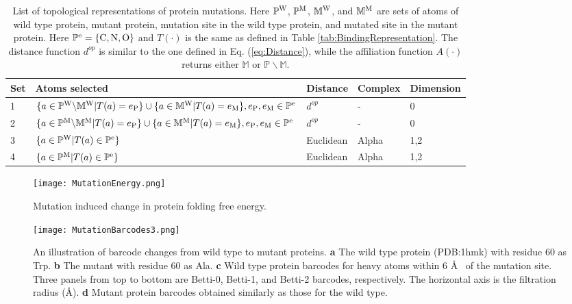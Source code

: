 \documentclass[10pt]{article}
\begin{document}
\begin{table}[ht]
\centering
\caption{List of topological representations of protein mutations. Here $\mathbb{P}^{\rm{W}}$, $\mathbb{P}^{\rm{M}}$, $\mathbb{M}^{\rm{W}}$, and $\mathbb{M}^{\rm{M}}$ are sets of atoms of wild type protein, mutant protein, mutation site in the wild type protein, and mutated site in the mutant protein. Here $\mathbb{P}^{\rm{e}}=\{\rm C, N, O \}$ and $T(\cdot)$ is the same as defined in Table \ref{tab:BindingRepresentation}. The distance function $d^{op}$ is similar to the one defined in Eq. (\ref{eq:Distance}), while the affiliation function $A(\cdot)$ returns either $\mathbb{M}$ or $\mathbb{P}\backslash\mathbb{M}$.}
\label{tab:MutationRepresentation}
\begin{tabular}{|l|l|l|l|l|}
\hline
 Set & Atoms selected & Distance & Complex & Dimension \\
\hline
1 & $\{a\in \mathbb{P}^{\rm{W}}\backslash\mathbb{M}^{\rm{W}}|T(a)=e_{\rm{P}}\}\cup\{a\in \mathbb{M}^{\rm{W}}|T(a)=e_{\rm{M}}\}, e_{\rm{P}},e_{\rm{M}}\in\mathbb{P}^{\rm{e}}$& $d^{op}$ & - & 0 \\
\hline
2 & $\{a\in \mathbb{P}^{\rm{M}}\backslash\mathbb{M}^{\rm{M}}|T(a)=e_{\rm{P}}\}\cup\{a\in \mathbb{M}^{\rm{M}}|T(a)=e_{\rm{M}}\}, e_{\rm{P}},e_{\rm{M}}\in\mathbb{P}^{\rm{e}}$& $d^{op}$ & - & 0 \\
\hline
3 & $\{a\in\mathbb{P}^{\rm{W}}|T(a)\in\mathbb{P}^{\rm{e}}\}$ & Euclidean & Alpha & 1,2 \\
\hline
4 & $\{a\in\mathbb{P}^{\rm{M}}|T(a)\in\mathbb{P}^{\rm{e}}\}$ & Euclidean & Alpha & 1,2 \\
\hline
\end{tabular}
\end{table}

\begin{figure}[ht]
\begin{center}
\texttt{[image: MutationEnergy.png]}
\caption{Mutation induced   change in protein folding free energy.}
\label{fig:MutationEnergy}
\end{center}
\end{figure}

\begin{figure}
\begin{center}
\texttt{[image: MutationBarcodes3.png]} %
\caption{An illustration of   barcode changes from wild type  to  mutant proteins. 
\textbf{a} The wild type protein (PDB:1hmk) with residue 60 as Trp. 
\textbf{b} The mutant with residue 60 as Ala. 
\textbf{c} Wild type protein barcodes for  heavy atoms  within 6 \AA~ of the mutation site.   Three panels  from top to bottom are Betti-0, Betti-1, and Betti-2 barcodes, respectively. The horizontal axis is the filtration radius (\AA).  
\textbf{d} Mutant protein barcodes obtained similarly as those for  the wild type.
}
\label{fig:MutationBarcodes}
\end{center}
\end{figure}
\end{document}
